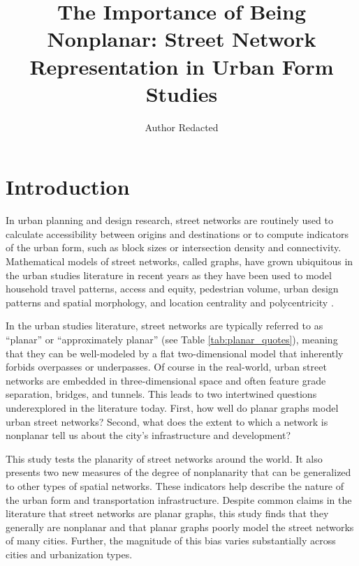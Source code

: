 \documentclass[Afour,sageh,times]{sagej}
\begin{document}
\title{The Importance of Being Nonplanar: Street Network Representation in Urban Form Studies}
\author{Author Redacted }


\begin{abstract}

\end{abstract}


\maketitle

\section{Introduction}

In urban planning and design research, street networks are routinely used to calculate accessibility between origins and destinations or to compute indicators of the urban form, such as block sizes or intersection density and connectivity. Mathematical models of street networks, called graphs, have grown ubiquitous in the urban studies literature in recent years as they have been used to model household travel patterns, access and equity, pedestrian volume, urban design patterns and spatial morphology, and location centrality and polycentricity \citep{marshall_street_2010,porta_alterations_2014,marshall_community_2014,hajrasouliha_impact_2015,parthasarathi_street_2015,knight_metrics_2015,gil_street_2016,zhong_revealing_2017}.

In the urban studies literature, street networks are typically referred to as \enquote{planar} or \enquote{approximately planar} (see Table \ref{tab:planar_quotes}), meaning that they can be well-modeled by a flat two-dimensional model that inherently forbids overpasses or underpasses. Of course in the real-world, urban street networks are embedded in three-dimensional space and often feature grade separation, bridges, and tunnels. This leads to two intertwined questions underexplored in the literature today. First, how well do planar graphs model urban street networks? Second, what does the extent to which a network is nonplanar tell us about the city's infrastructure and development?

This study tests the planarity of street networks around the world. It also presents two new measures of the degree of nonplanarity that can be generalized to other types of spatial networks. These indicators help describe the nature of the urban form and transportation infrastructure. Despite common claims in the literature that street networks are planar graphs, this study finds that they generally are nonplanar and that planar graphs poorly model the street networks of many cities. Further, the magnitude of this bias varies substantially across cities and urbanization types.
\end{document}
